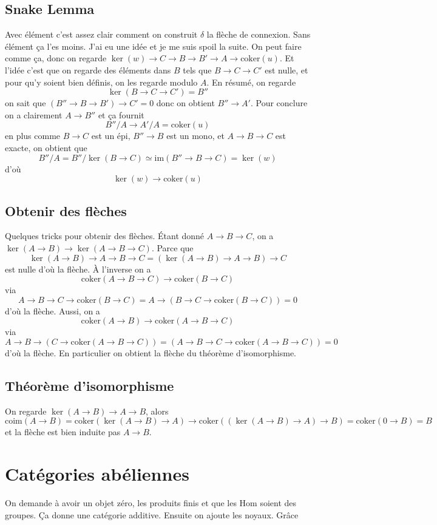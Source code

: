 \documentclass[a4paper,12pt]{book}
\newcommand{\Hom}{\textrm{Hom}}
\newcommand{\im}{\textrm{im}}
\newcommand{\coker}{\textrm{coker}}
\newcommand{\coim}{\textrm{coim}}
\theoremstyle{plain}
\theoremstyle{definition}
\theoremstyle{remark}
\begin{document}
\section{Snake Lemma}
Avec élément c'est assez clair comment on construit $\delta$ la
flèche de connexion. Sans élément ça l'es moins. J'ai eu une
idée et je me suis spoil la suite. On peut faire comme ça, donc
on regarde $\ker(w)\to C\to B\to B'\to A\to \coker(u)$. Et l'idée
c'est que on regarde des éléments dans $B$ tels que $B\to C\to C'$
est nulle, et pour qu'y soient bien définis, on les regarde modulo
$A$. En résumé, on regarde \[\ker(B\to C\to C')=B''\] on sait que
$(B''\to B\to B')\to C'=0$ donc on obtient $B''\to A'$. Pour 
conclure on a clairement $A\to B''$ et ça fournit
\[B''/A\to A'/A=\coker(u)\] en plus comme
$B\to C$ est un épi, $B''\to B$ est un mono, et $A\to B\to C$ est
exacte, on obtient que 
\[B''/A=B''/\ker(B\to C)\simeq\im( B''\to B\to C)=\ker(w)\] d'où
\[\ker(w)\to \coker(u)\]

\section{Obtenir des flèches}
Quelques tricks pour obtenir des flèches. Étant donné
$A\to B\to C$, on a $\ker(A\to B)\to \ker(A\to B\to C)$.
Parce que \[\ker( A\to B)\to A\to B\to C=(\ker(A\to B)\to A\to B)\to C\]
est nulle d'où la flèche. À l'inverse on a 
\[\coker(A\to B\to C)\to \coker(B\to C)\]
via 
\[A\to B\to C\to \coker(B\to C)=A\to (B\to C\to \coker(B\to C))=0\]
d'où la flèche. Aussi, on a 
\[\coker(A\to B)\to \coker(A\to B\to C)\]
via \[A\to B\to (C\to \coker(A\to B\to C))=(A\to B \to C\to \coker(A\to B\to C))=0\]
d'où la flèche. En particulier on obtient la flèche du théorème
d'isomorphisme.

\section{Théorème d'isomorphisme}
On regarde $\ker(A\to B)\to A\to B$, alors
\[\coim(A\to B)=\coker(\ker(A\to B)\to A)\to \coker((\ker(A\to B)\to A)\to B)=\coker(0\to B)=B\]
et la flèche est bien induite pas $A\to B$.

\chapter{Catégories abéliennes}
On demande à avoir un objet zéro, les
produits finis et que les $\Hom$ soient des
groupes. Ça donne une catégorie additive. Ensuite
on ajoute les noyaux. Grâce
\end{document}
